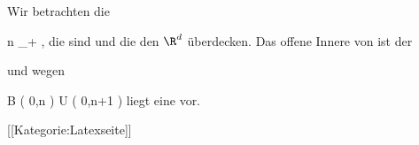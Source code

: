Wir betrachten die

 {}
 {n \in \N_+} {}
 {} {} {} {,}
die
sind und die den $\R^d$ überdecken. Das offene Innere von
ist der

 und wegen

\mavergleichskettedisp
{\vergleichskette
{ B  \left(  0,n \right)
}
{ \subseteq} { U \left(   0,n+1  \right)
}
{ } {
}
{ } {
}
{ } {
}
}
{}{}{}
liegt eine
vor.

 [[Kategorie:Latexseite]]
